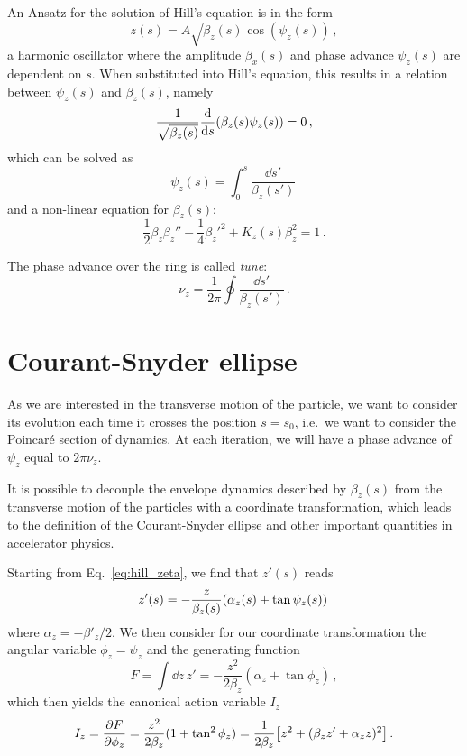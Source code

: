 An Ansatz for the solution of Hill's equation is in the form
\begin{equation}
	z(s)=A\sqrt{\beta_z(s)}\cos\left(\psi_z(s)\right)\,,
	\label{eq:hill_zeta}
\end{equation}
%
\ie a harmonic oscillator where the amplitude $\beta_x(s)$ and phase advance $\psi_z(s)$ are dependent on $s$. When substituted into Hill's equation, this results in a relation between $\psi_z(s)$ and $\beta_z(s)$, namely
%
\begin{equation}
	\frac{1}{\sqrt{\beta_z(s)}} \dv{s}(\beta_z(s)\psi_z(s)) = 0\,,
\end{equation}
%
which can be solved as
%
\begin{equation}
	\psi_z(s) = \int_0^s \frac{\dd s'}{\beta_z(s')}\,
\end{equation}
%
and a non-linear equation for $\beta_z(s)$:
%
\begin{equation}
	\frac{1}{2}\beta_z\beta_z''-\frac{1}{4}\beta_z'^2+K_z(s)\beta_z^2=1\,.
\end{equation}

The phase advance over the ring is called \textit{tune}:
\begin{equation}
	\nu_z = \frac{1}{2\pi}\oint \frac{\dd s'}{\beta_z(s')}\,.
    \label{eq:tune_def}
\end{equation} 


\section{Courant-Snyder ellipse} \label{sec:acc:cs_ellipse}

As we are interested in the transverse motion of the particle, we want to consider its evolution each time it crosses the position $s=s_0$, i.e.\ we want to consider the Poincaré section of dynamics. At each iteration, we will have a phase advance of $\psi_z$ equal to $2\pi\nu_z$.

It is possible to decouple the envelope dynamics described by $\beta_z(s)$ from the transverse motion of the particles with a coordinate transformation, which leads to the definition of the Courant-Snyder ellipse and other important quantities in accelerator physics.

Starting from Eq.~\eqref{eq:hill_zeta}, we find that $z'(s)$ reads
%
\begin{equation}
	z'(s)=-\frac{z}{\beta_z(s)}\qty(\alpha_z(s)+\tan\psi_z(s))\,
\end{equation}
%
where $\alpha_z=-\beta'_z/2$. We then consider for our coordinate transformation the angular variable $\phi_z=\psi_z$ and the generating function
%
\begin{equation}
	F=\int \dd z\, z' = -\frac{z^2}{2\beta_z}(\alpha_z+\tan\phi_z) \,,
\end{equation}
%
which then yields the canonical action variable $I_z$
%
\begin{equation}
	I_z=\pdv{F}{\phi_z}=\frac{z^2}{2\beta_z}(1+\tan^2\phi_z)=\frac{1}{2\beta_z}\qty[z^2+(\beta_z z'+\alpha_z z)^2]\,.
	\label{eq:jz}
\end{equation}

